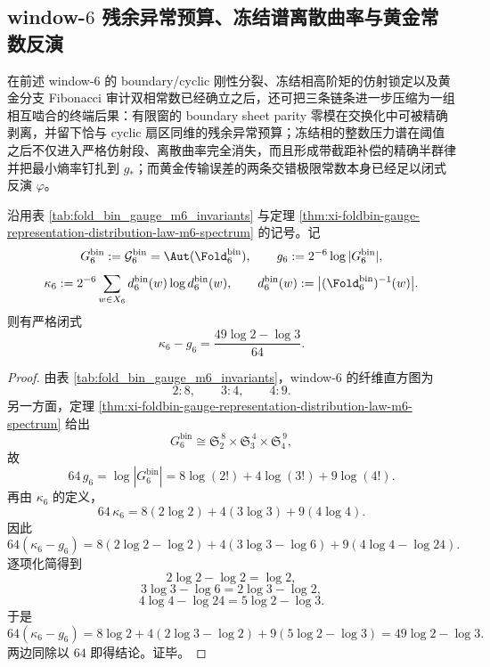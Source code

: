 \subsection{window-\texorpdfstring{$6$}{6} 残余异常预算、冻结谱离散曲率与黄金常数反演}\label{subsec:conclusion-window6-residual-budget-freezing-golden-constants}
在前述 window-\(6\) 的 boundary/cyclic 刚性分裂、冻结相高阶矩的仿射锁定以及黄金分支 Fibonacci 审计双相常数已经确立之后，还可把三条链条进一步压缩为一组相互啮合的终端后果：有限窗的 boundary sheet parity 零模在交换化中可被精确剥离，并留下恰与 cyclic 扇区同维的残余异常预算；冻结相的整数压力谱在阈值之后不仅进入严格仿射段、离散曲率完全消失，而且形成带截距补偿的精确半群律并把最小熵率钉扎到 \(g_*\)；而黄金传输误差的两条交错极限常数本身已经足以闭式反演 \(\varphi\)。

\begin{theorem}\label{thm:conclusion-window6-gauge-defect-exact-log-gap}
沿用表 \ref{tab:fold_bin_gauge_m6_invariants} 与定理 \ref{thm:xi-foldbin-gauge-representation-distribution-law-m6-spectrum} 的记号。记
\[
G_6^{\mathrm{bin}}:=\mathcal G_6^{\mathrm{bin}}=\Aut(\Fold_6^{\mathrm{bin}}),
\qquad
g_6:=2^{-6}\log|G_6^{\mathrm{bin}}|,
\]
\[
\kappa_6:=
2^{-6}\sum_{w\in X_6}d_6^{\mathrm{bin}}(w)\log d_6^{\mathrm{bin}}(w),
\qquad
d_6^{\mathrm{bin}}(w):=\bigl|(\Fold_6^{\mathrm{bin}})^{-1}(w)\bigr|.
\]
则有严格闭式
\[
\boxed{\;
\kappa_6-g_6=\frac{49\log 2-\log 3}{64}.\;}
\]
\end{theorem}
\begin{proof}
由表 \ref{tab:fold_bin_gauge_m6_invariants}，window-\(6\) 的纤维直方图为
\[
2:8,\qquad 3:4,\qquad 4:9.
\]
另一方面，定理 \ref{thm:xi-foldbin-gauge-representation-distribution-law-m6-spectrum} 给出
\[
G_6^{\mathrm{bin}}\cong \mathfrak S_2^{\,8}\times \mathfrak S_3^{\,4}\times \mathfrak S_4^{\,9},
\]
故
\[
64\,g_6
=
\log|G_6^{\mathrm{bin}}|
=
8\log(2!)+4\log(3!)+9\log(4!).
\]
再由 \(\kappa_6\) 的定义，
\[
64\,\kappa_6
=
8(2\log 2)+4(3\log 3)+9(4\log 4).
\]
因此
\[
64(\kappa_6-g_6)
=
8(2\log 2-\log 2)
+4(3\log 3-\log 6)
+9(4\log 4-\log 24).
\]
逐项化简得到
\[
2\log 2-\log 2=\log 2,
\]
\[
3\log 3-\log 6=2\log 3-\log 2,
\]
\[
4\log 4-\log 24=5\log 2-\log 3.
\]
于是
\[
64(\kappa_6-g_6)
=
8\log 2+4(2\log 3-\log 2)+9(5\log 2-\log 3)
=
49\log 2-\log 3.
\]
两边同除以 \(64\) 即得结论。证毕。
\end{proof}

